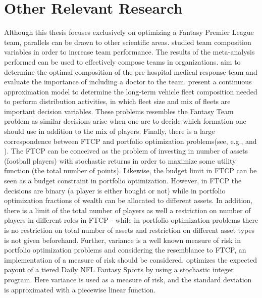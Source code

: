\section{Other Relevant Research}
Although this thesis focuses exclusively on optimizing a Fantasy Premier League team, parallels can be drawn to other scientific areas. \cite{Bell} studied team composition variables in order to increase team performance. The results of the meta-analysis performed can be used to effectively compose teams in organizations. \cite{Davis} aim to determine the optimal composition of the pre-hospital medical response team and evaluate the importance of including a doctor to the team. \cite{Jabali} present a continuous approximation model to determine the long-term vehicle fleet composition needed to perform distribution activities, in which fleet size and mix of fleets are important decision variables.  These problems resembles the Fantasy Team problem as similar decisions arise when one are to decide which formation one should use in addition to the mix of players. 
\newpar
Finally, there is a large correspondence between FTCP and portfolio optimization problems(see, e.g., \cite{Markowitz} and \cite{Speranza}). The FTCP can be conceived as the problem of investing in number of assets (football players) with stochastic returns in order to maximize some utility function (the total number of points). Likewise, the budget limit in FTCP can be seen as a budget constraint in portfolio optimization. However, in FTCP the decisions are binary (a player is either bought or not) while in portfolio optimization fractions of wealth can be allocated to different assets. In addition, there is a limit of the total number of players as well a restriction on number of players in different roles in FTCP - while in portfolio optimization problems there is no restriction on total number of assets and restriction on different asset types is not given beforehand. Further, variance is a well known measure of risk in portfolio optimization problems and considering the resemblance to FTCP, an implementation of a measure of risk should be considered. \cite{Dailyfantasysports} optimizes the expected payout of a tiered Daily NFL Fantasy Sports by using a stochastic integer program. Here variance is used as a measure of risk, and the standard deviation is approximated with a piecewise linear function. 

